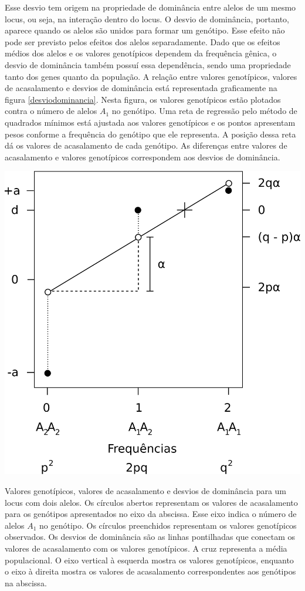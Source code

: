 \documentclass[portuges,]{tufte-handout}
\begin{document}
Esse desvio tem origem na propriedade de dominância entre alelos de um
mesmo locus, ou seja, na interação dentro do locus. O desvio de
dominância, portanto, aparece quando os alelos são unidos para formar um
genótipo. Esse efeito não pode ser previsto pelos efeitos dos alelos
separadamente. Dado que os efeitos médios dos alelos e os valores
genotípicos dependem da frequência gênica, o desvio de dominância também
possuí essa dependência, sendo uma propriedade tanto dos genes quanto da
população. A relação entre valores genotípicos, valores de acasalamento
e desvios de dominância está representada graficamente na figura
\ref{desviodominancia}. Nesta figura, os valores genotípicos estão
plotados contra o número de alelos \(A_1\) no genótipo. Uma reta de
regressão pelo método de quadrados mínimos está ajustada aos valores
genotípicos e os pontos apresentam pesos conforme a frequência do
genótipo que ele representa. A posição dessa reta dá os valores de
acasalamento de cada genótipo. As diferenças entre valores de
acasalamento e valores genotípicos correspondem aos desvios de
dominância.

\begin{marginfigure}
\includegraphics{./figuras/desviodominancia.png}
\caption{Valores genotípicos, valores de acasalamento e desvios
de dominância para um locus com dois alelos. Os círculos abertos
representam os valores de acasalamento para os genótipos apresentados no
eixo da abscissa. Esse eixo indica o número de alelos \(A_1\) no
genótipo. Os círculos preenchidos representam os valores genotípicos
observados. Os desvios de dominância são as linhas pontilhadas que
conectam os valores de acasalamento com os valores genotípicos. A cruz
representa a média populacional. O eixo vertical à esquerda mostra os
valores genotípicos, enquanto o eixo à direita mostra os valores de
acasalamento correspondentes aos genótipos na abscissa.}
\label{desviodominancia}
\end{marginfigure}
\end{document}
